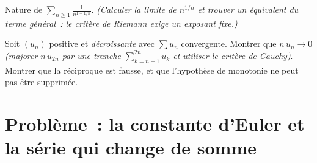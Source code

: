 \begin{exercise}[$\star\star$]\label{exo:b1:series:11}
Nature de $\displaystyle\sum_{n \geq 1} \frac{1}{n^{1 + 1/n}}$.
\emph{(Calculer la limite de $n^{1/n}$ et trouver un équivalent du
terme général~: le critère de Riemann exige un exposant
\emph{fixe}.)}
\end{exercise}

\begin{exercise}[$\star\star\star$]\label{exo:b1:series:12}
Soit $(u_n)$ positive et \emph{décroissante} avec $\sum u_n$
convergente. Montrer que $n\,u_n \to 0$ \emph{(majorer $n\,u_{2n}$
par une tranche $\sum_{k=n+1}^{2n} u_k$ et utiliser le critère de
Cauchy)}. Montrer que la réciproque est fausse, et que l'hypothèse
de monotonie ne peut pas être supprimée.
\end{exercise}

\section{Problème~: la constante d'Euler et la série qui change
de somme}

